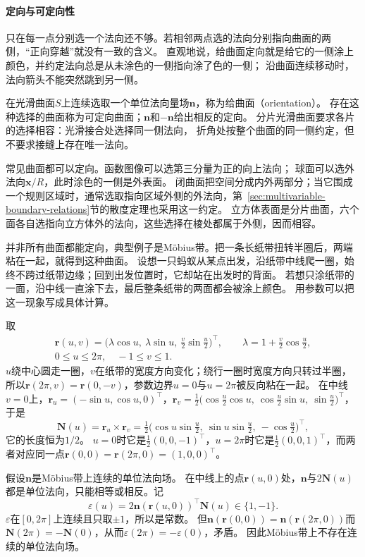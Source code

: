 \paragraph{定向与可定向性}

只在每一点分别选一个法向还不够。若相邻两点选的法向分别指向曲面的两侧，“正向穿越”就没有一致的含义。
直观地说，给曲面定向就是给它的一侧涂上颜色，并约定法向总是从未涂色的一侧指向涂了色的一侧；
沿曲面连续移动时，法向箭头不能突然跳到另一侧。

\begin{definition}[曲面的定向]
\label{def:analysis-surface-orientation}
在光滑曲面$S$上连续选取一个单位法向量场$\bm n$，称为给曲面（orientation）。
存在这种选择的曲面称为可定向曲面；$\bm n$和$-\bm n$给出相反的定向。
分片光滑曲面要求各片的选择相容：光滑接合处选择同一侧法向，
折角处按整个曲面的同一侧约定，但不要求接缝上存在唯一法向。
\end{definition}

常见曲面都可以定向。函数图像可以选第三分量为正的向上法向；
球面可以选外法向$\bm x/R$，此时涂色的一侧是外表面。
闭曲面把空间分成内外两部分；当它围成一个规则区域时，通常选取指向区域外侧的外法向，第~\ref{sec:multivariable-boundary-relations}节的散度定理也采用这一约定。
立方体表面是分片曲面，六个面各自选指向立方体外的法向，这些选择在棱处都属于外侧，因而相容。

并非所有曲面都能定向，典型例子是Möbius带。把一条长纸带扭转半圈后，两端粘在一起，就得到这种曲面。
设想一只蚂蚁从某点出发，沿纸带中线爬一圈，始终不跨过纸带边缘；回到出发位置时，它却站在出发时的背面。
若想只涂纸带的一面，沿中线一直涂下去，最后整条纸带的两面都会被涂上颜色。
用参数可以把这一现象写成具体计算。

\begin{example}[Möbius带上的法向绕行一圈后反向]
\label{ex:analysis-mobius-normal-reversal}
取
\[
 \begin{gathered}
 \bm r(u,v)=\bigl(\lambda\cos u,\ \lambda\sin u,\ \tfrac v2\sin\tfrac u2\bigr)^\top,
 \qquad \lambda=1+\tfrac v2\cos\tfrac u2,\\
 0\leq u\leq2\pi,\quad -1\leq v\leq1.
 \end{gathered}
\]
$u$绕中心圆走一圈，$v$在纸带的宽度方向变化；绕行一圈时宽度方向只转过半圈，所以$\bm r(2\pi,v)=\bm r(0,-v)$，参数边界$u=0$与$u=2\pi$被反向粘在一起。
在中线$v=0$上，$\bm r_u=(-\sin u,\cos u,0)^\top$，$\bm r_v=\tfrac12\bigl(\cos\tfrac u2\cos u,\ \cos\tfrac u2\sin u,\ \sin\tfrac u2\bigr)^\top$，于是
\[
 \bm N(u)=\bm r_u\times\bm r_v=\tfrac12\bigl(\cos u\sin\tfrac u2,\ \sin u\sin\tfrac u2,\ -\cos\tfrac u2\bigr)^\top,
\]
它的长度恒为$1/2$。
$u=0$时它是$\frac12(0,0,-1)^\top$，$u=2\pi$时它是$\frac12(0,0,1)^\top$，而两者对应同一点$\bm r(0,0)=\bm r(2\pi,0)=(1,0,0)^\top$。

假设$\bm n$是Möbius带上连续的单位法向场。
在中线上的点$\bm r(u,0)$处，$\bm n$与$2\bm N(u)$都是单位法向，只能相等或相反。记
\[
 \varepsilon(u)=2\bm n(\bm r(u,0))^\top\bm N(u)\in\{1,-1\}.
\]
$\varepsilon$在$[0,2\pi]$上连续且只取$\pm1$，所以是常数。
但$\bm n(\bm r(0,0))=\bm n(\bm r(2\pi,0))$而$\bm N(2\pi)=-\bm N(0)$，从而$\varepsilon(2\pi)=-\varepsilon(0)$，矛盾。
因此Möbius带上不存在连续的单位法向场。
\end{example}

